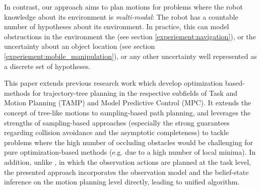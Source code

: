 \documentclass[letterpaper, 10 pt, conference]{ieeeconf}  %
\begin{document}
In contrast, our approach aims to plan motions for problems where the robot knowledge about its environment is \textit{multi-modal}: The robot has a countable number of hypotheses about its environment. In practice, this can model obstructions in the environment the (see section \ref{experiement:navigation}), or the uncertainty about an object location (see section \ref{experiement:mobile_manipulation}), or any other uncertainty well represented as a discrete set of hypotheses.

This paper extends previous research work \cite{tamp-1}\cite{control-tree-1} which develop optimization based-methods for trajectory-tree planning in the respective subfields of Task and Motion Planning (TAMP) and Model Predictive Control (MPC). It extends the concept of tree-like motions to sampling-based path planning, and leverages the strengths of sampling-based approaches (especially the strong guarantees regarding collision avoidance and the asymptotic completeness) to tackle problems where the high number of occluding obstacles would be challenging for pure optimization-based methods (e.g. due to a high number of local minima). %
In addition, unlike \cite{tamp-1}, in which the observation actions are planned at the task level, the presented approach incorporates the observation model and the belief-state inference on the motion planning level directly, leading to unified algorithm.



\end{document}
